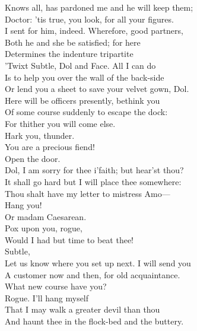 \documentclass[a4paper,oneside,12pt]{memoir}
\begin{document}
\begin{drama*}
Knows all, has pardoned me and he will keep them;\\
Doctor: 'tis true, you look, for all your figures.\\
I sent for him, indeed. Wherefore, good partners,\\
Both he and she be satisfied; for here\\
Determines the indenture tripartite\\
'Twixt Subtle, Dol and Face. All I can do\\
Is to help you over the wall of the back-side\\
Or lend you a sheet to save your velvet gown, Dol.\\
Here will be officers presently, bethink you\\
Of some course suddenly to escape the dock:\\
For thither you will come else.\\
 Hark you, thunder.\\
\subtlespeaks You are a precious fiend!\\
\mammonspeaks {} Open the door.\\
\facespeaks Dol, I am sorry for thee i'faith; but hear'st thou?\\
It shall go hard but I will place thee somewhere:\\
Thou shalt have my letter to mistress Amo---\\
\dolspeaks Hang you!\\
\facespeaks {} Or madam Caesarean.\\
\dolspeaks {} Pox upon you, rogue,\\
Would I had but time to beat thee!\\
\facespeaks {} Subtle,\\
Let us know where you set up next. I will send you\\
A customer now and then, for old acquaintance.\\
What new course have you?\\
\subtlespeaks {} Rogue. I'll hang myself\\
That I may walk a greater devil than thou\\
And haunt thee in the flock-bed and the buttery.\\


\end{drama*}
\end{document}

